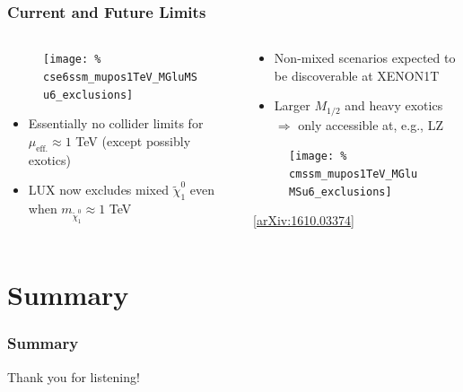 \documentclass[10pt,aspectratio=169]{beamer}
\begin{document}
\begin{frame}
  \frametitle{Current and Future Limits}
  \begin{columns}[t]
    \begin{column}{0.5\textwidth}
      \vspace{-22pt}
      \begin{figure}
        \texttt{[image: \%
          cse6ssm\_mupos1TeV\_MGluMSu6\_exclusions]}
      \end{figure}
      \vspace*{-8pt}
      \begin{itemize}\itemsep1em
        \item Essentially no collider limits for $\mu_{\text{eff.}}
          \approx 1$ TeV ({\color{blue}except possibly exotics})
        \item {\color{red} LUX now excludes mixed
          $\tilde{\chi}_1^0$ even when $m_{\tilde{\chi}_1^0} \approx 1$ TeV}
      \end{itemize}
    \end{column}
    \begin{column}{0.5\textwidth}
      \vspace{-22pt}
      \begin{itemize}\itemsep1em
        \item Non-mixed scenarios expected to be discoverable at
          XENON1T
        \item Larger $M_{1/2}$ and heavy exotics $\Rightarrow$ only
          accessible at, e.g., LZ
      \end{itemize}
      \begin{figure}
        \texttt{[image: \%
          cmssm\_mupos1TeV\_MGluMSu6\_exclusions]}
      \end{figure}
      \vspace{-20pt}
      \begin{center}
        \tiny [\href{https://arxiv.org/abs/1610.03374}{arXiv:1610.03374}]
      \end{center}
    \end{column}
  \end{columns}
\end{frame}

\section{Summary}

\begin{frame}
  \frametitle{Summary}
    \begin{center}
    \large Thank you for listening!
  \end{center}
\end{frame}
\end{document}
